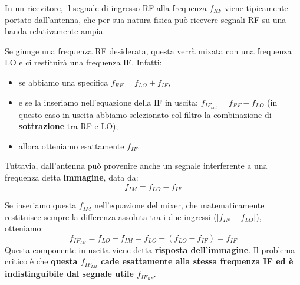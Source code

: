 \documentclass[openany,a4paper,12pt]{book}
\begin{document}
In un ricevitore, il segnale di ingresso RF alla frequenza $f_{RF}$ viene tipicamente portato dall'antenna, che per sua natura fisica può ricevere segnali RF su una banda relativamente ampia.

Se giunge una frequenza RF desiderata, questa verrà mixata con una frequenza LO e ci restituirà una frequenza IF. Infatti:
\begin{itemize}[label=\textcolor{ForestGreen}{\textbullet}]
    \item se abbiamo una specifica $f_{RF} = f_{LO} + f_{IF}$,
    \item e se la inseriamo nell'equazione della IF in uscita: $f_{IF_{out}} = f_{RF} - f_{LO}$ (in questo caso in uscita abbiamo selezionato col filtro la combinazione di \textbf{sottrazione} tra RF e LO);
    \item allora otteniamo esattamente $f_{IF}$.
\end{itemize}

Tuttavia, dall'antenna può provenire anche un segnale interferente a una frequenza detta \textbf{immagine}, data da:
\begin{equation}
    f_{IM} = f_{LO} - f_{IF}
\end{equation}

Se inseriamo questa $f_{IM}$ nell'equazione del mixer, che matematicamente restituisce sempre la differenza assoluta tra i due ingressi ($|f_{IN} - f_{LO}|$), otteniamo:
\begin{equation}
    f_{IF_{IM}} = f_{LO} - f_{IM} = f_{LO} - (f_{LO} - f_{IF}) = f_{IF}
\end{equation}
Questa componente in uscita viene detta \textbf{risposta dell'immagine}. 
Il problema critico è che \textbf{questa $f_{IF_{IM}}$ cade esattamente alla stessa frequenza IF ed è indistinguibile dal segnale utile $f_{IF_{RF}}$}.
\end{document}
